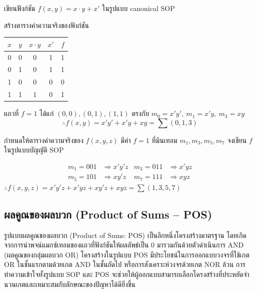 \begin{ex}
\label{ex:canonical-sop}
เขียนฟังก์ชัน $f(x, y) = x \cdot y + x'$ ในรูปแบบ canonical SOP
\end{ex}
\begin{solution}
สร้างตารางค่าความจริงของฟังก์ชัน
\begin{center}
\begin{tabular}{|c|c|c|c|c|}
\hline
$x$ & $y$ & $x \cdot y$ & $x'$ & $f$ \\
\hline
0 & 0 & 0 & 1 & 1 \\
\hline
0 & 1 & 0 & 1 & 1 \\
\hline
1 & 0 & 0 & 0 & 0 \\
\hline
1 & 1 & 1 & 0 & 1 \\
\hline
\end{tabular}
\end{center}
แถวที่ $f = 1$ ได้แก่ $(0,0), (0,1), (1,1)$ ตรงกับ $m_0 = x'y',\ m_1 = x'y,\ m_3 = xy$
\[
\therefore f(x, y) = x'y' + x'y + xy = \sum(0, 1, 3)
\]
\solhere
\end{solution}

\begin{ex}
\label{ex:sop-from-minterms}
กำหนดให้ตารางค่าความจริงของ $f(x, y, z)$ มีค่า $f = 1$ ที่มินเทอม $m_1, m_3, m_5, m_7$ จงเขียน $f$ ในรูปแบบบัญญัติ SOP
\end{ex}
\begin{solution}
\begin{align*}
m_1 = 001 &\Rightarrow x'y'z & m_3 = 011 &\Rightarrow x'yz\\
m_5 = 101 &\Rightarrow xy'z & m_7 = 111 &\Rightarrow xyz
\end{align*}
$\therefore f(x, y, z) = x'y'z + x'yz + xy'z + xyz = \sum(1, 3, 5, 7)$ \solhere
\end{solution}

\subsection{ผลคูณของผลบวก (Product of Sums -- POS)}
รูปแบบผลคูณของผลบวก (Product of Sums: POS) เป็นอีกหนึ่งโครงสร้างมาตรฐาน โดยเกิดจากการนำพจน์แมกซ์เทอมของแถวที่ฟังก์ชันให้ผลลัพธ์เป็น 0 มารวมกันด้วยตัวดำเนินการ AND (ผลคูณของกลุ่มผลบวก OR) โครงสร้างในรูปแบบ POS มีประโยชน์ในการออกแบบวงจรที่ใช้เกต OR ในชั้นแรกตามด้วยเกต AND ในชั้นถัดไป หรือการสังเคราะห์วงจรด้วยเกต NOR ล้วน การทำความเข้าใจทั้งรูปแบบ SOP และ POS จะช่วยให้ผู้ออกแบบสามารถเลือกโครงสร้างที่ประหยัดจำนวนเกตและเหมาะสมกับลักษณะของปัญหาได้ดียิ่งขึ้น~\parencite{gersting2014structures}

